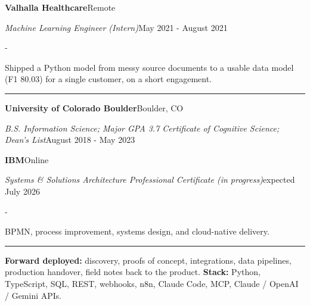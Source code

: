 \documentclass[10pt,letterpaper]{article}
\newenvironment{cvitems}{%
  \begin{list}{-}{%
    \setlength{\leftmargin}{12pt}%
    \setlength{\itemsep}{1.2pt}%
    \setlength{\parsep}{0pt}%
    \setlength{\topsep}{1.5pt}%
    \setlength{\partopsep}{0pt}%
    \setlength{\labelwidth}{6pt}%
    \setlength{\labelsep}{6pt}%
    \setlength{\itemindent}{0pt}%
  }%
}{\end{list}}
\newcommand{\cvsection}[1]{%
  \vspace{7pt}%
  \noindent{\bfseries\fontsize{11pt}{13pt}\selectfont\MakeUppercase{#1}}\par
  \vspace{1pt}%
  \noindent\rule{\textwidth}{0.4pt}\par
  \vspace{4pt}%
}
\newcommand{\cventryhead}[4]{%
  \noindent\textbf{#1}\hfill#2\par
  \vspace{0.5pt}%
  \noindent\textit{#3}\hfill#4\par
}
\newcommand{\cveduhead}[4]{%
  \noindent\textbf{#1}\hfill#2\par
  \vspace{0.5pt}%
  \noindent\textit{#3}\hfill#4\par
}
\begin{document}
\vspace{3pt}
\cventryhead{Valhalla Healthcare}{Remote}
{Machine Learning Engineer (Intern)}{May 2021 - August 2021}
\begin{cvitems}
  \item Shipped a Python model from messy source documents to a usable data model (F1 80.03) for a single customer, on a short engagement.
\end{cvitems}

\cvsection{Education}

\cveduhead{University of Colorado Boulder}{Boulder, CO}
{B.S. Information Science; Major GPA 3.7 \textbar{} Certificate of Cognitive Science; Dean's List}{August 2018 - May 2023}

\vspace{3pt}
\cveduhead{IBM}{Online}
{Systems \& Solutions Architecture Professional Certificate (in progress)}{expected July 2026}
\begin{cvitems}
  \item BPMN, process improvement, systems design, and cloud-native delivery.
\end{cvitems}

\cvsection{Skills}

{\raggedright
\noindent\textbf{Forward deployed:} discovery, proofs of concept, integrations, data pipelines, production handover, field notes back to the product. \textbf{Stack:} Python, TypeScript, SQL, REST, webhooks, n8n, Claude Code, MCP, Claude / OpenAI / Gemini APIs.\par
}
\end{document}
